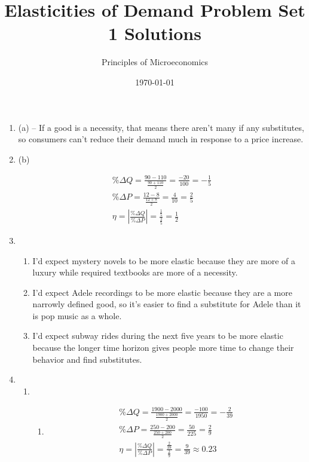 \documentclass{article}
\title{Elasticities of Demand Problem Set 1 Solutions}
\author{Principles of Microeconomics}
\date{\today}
\begin{document}
\maketitle

\begin{enumerate}

\item (a) -- If a good is a necessity, that means there aren't many if any substitutes, so consumers can't reduce their demand much in response to a price increase. 

\item (b)

	\begin{gather*}
	\% \Delta Q = \frac{90 - 110}{\frac{90 + 110}{2}} = \frac{-20}{100} = -\frac{1}{5} \\
	\% \Delta P = \frac{12 - 8}{\frac{12 + 8}{2}} = \frac{4}{10} = \frac{2}{5} \\
	\eta = \left| \frac{\% \Delta Q}{\% \Delta P} \right| = \frac{\frac{1}{5}}{\frac{2}{5}} = \frac{1}{2}
	\end{gather*}

\item

	\begin{enumerate}
	
	\item I'd expect mystery novels to be more elastic because they are more of a luxury while required textbooks are more of a necessity.
	
	\item I'd expect Adele recordings to be more elastic because they are a more narrowly defined good, so it's easier to find a substitute for Adele than it is pop music as a whole.
	
	\item I'd expect subway rides during the next five years to be more elastic because the longer time horizon gives people more time to change their behavior and find substitutes.
	
	\end{enumerate}
	
\item

	\begin{enumerate}
	
	\item 
	
		\begin{enumerate}
		
		\item 
		\begin{gather*}
		\% \Delta Q = \frac{1900 - 2000}{\frac{1900 + 2000}{2}} = \frac{-100}{1950} = -\frac{2}{39} \\
		\% \Delta P = \frac{250 - 200}{\frac{250 + 200}{2}}  = \frac{50}{225} = \frac{2}{9} \\
		\eta = \left| \frac{\% \Delta Q}{\% \Delta P} \right| = \frac{\frac{2}{39}}{\frac{2}{9}} = \frac{9}{39} \approx 0.23
		\end{gather*}
		

\end{enumerate}
\end{enumerate}
\end{enumerate}
\end{document}
